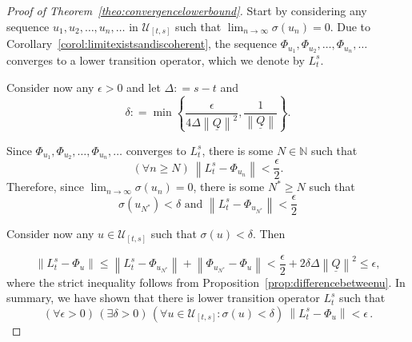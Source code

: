 \documentclass[10pt]{paper}
\theoremstyle{definition}
\newcommand{\nats}{\mathbb{N}}
\newcommand{\lbound}{L}
\newcommand{\lrate}{\underline{Q}}
\newcommand{\norm}[1]{\left\lVert #1 \right\rVert}
\newcommand{\coloneqq}{:\!=}
\begin{document}
\begin{proof}[Proof of Theorem~\ref{theo:convergencelowerbound}]
Start by considering any sequence $u_1,u_2,\dots,u_n,\dots$ in $\mathcal{U}_{[t,s]}$ such that $\lim_{n\to\infty}\sigma(u_n)=0$. Due to Corollary~\ref{corol:limitexistsandiscoherent}, the sequence $\Phi_{u_1},\Phi_{u_2},\dots,\Phi_{u_n},\dots$ converges to a lower transition operator, which we denote by $\lbound_t^s$. 

Consider now any $\epsilon>0$ and let $\Delta\coloneqq s-t$ and
\begin{equation*}
\delta\coloneqq\min\left\{\frac{\epsilon}{4\Delta\norm{\lrate}^2},\frac{1}{\norm{\lrate}}\right\}.
\end{equation*}

\noindent Since $\Phi_{u_1},\Phi_{u_2},\dots,\Phi_{u_n},\dots$ converges to $\lbound_t^s$, there is some $N\in\nats$ such that
\begin{equation*}
(\forall n\geq N)~\norm{\lbound_t^s - \Phi_{u_n}}<\frac{\epsilon}{2}.
\end{equation*}
Therefore, since $\lim_{n\to\infty}\sigma(u_n)=0$, there is some $N^*\geq N$ such that
\begin{equation*}
\sigma(u_{N^*})<\delta\text{ and }\norm{\lbound_t^s - \Phi_{u_{N^*}}}<\frac{\epsilon}{2}
\end{equation*}

\noindent Consider now any $u\in\mathcal{U}_{[t,s]}$ such that $\sigma(u)<\delta$. Then

\begin{equation*}
\norm{\lbound_t^s - \Phi_u}\leq\norm{\lbound_t^s-\Phi_{u_{N^*}}}
+\norm{\Phi_{u_{N^*}}-\Phi_u}
<\frac{\epsilon}{2}+2\delta\Delta\norm{\lrate}^2\leq\epsilon,
\end{equation*}
where the strict inequality follows from Proposition~\ref{prop:differencebetweenu}.
In summary, we have shown that there is lower transition operator $\lbound_t^s$ such that
\begin{equation*}
(\forall\epsilon>0)\,
(\exists\delta>0)\,
(\forall u\in\mathcal{U}_{[t,s]}\colon\sigma(u)<\delta)~\norm{\lbound_t^s - \Phi_u}<\epsilon\,.
\end{equation*}
\end{proof}
\end{document}
